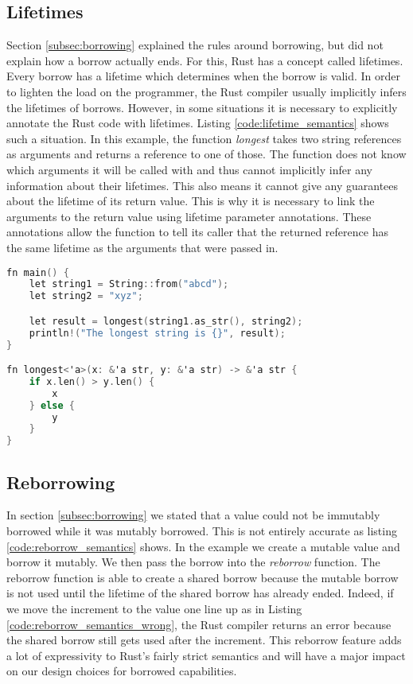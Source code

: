 \subsection{Lifetimes}
Section \ref{subsec:borrowing} explained the rules around borrowing, but did not explain how a borrow actually ends. For this, Rust has a concept called lifetimes. Every borrow has a lifetime which determines when the borrow is valid. In order to lighten the load on the programmer, the Rust compiler usually implicitly infers the lifetimes of borrows. However, in some situations it is necessary to explicitly annotate the Rust code with lifetimes. Listing \ref{code:lifetime_semantics} shows such a situation. In this example, the function \textit{longest} takes two string references as arguments and returns a reference to one of those. The function does not know which arguments it will be called with and thus cannot implicitly infer any information about their lifetimes. This also means it cannot give any guarantees about the lifetime of its return value. This is why it is necessary to link the arguments to the return value using lifetime parameter annotations. These annotations allow the function to tell its caller that the returned reference has the same lifetime as the arguments that were passed in.
\begin{lstlisting}[language=C,frame=single,caption=Lifetime Example,label=code:lifetime_semantics]
fn main() {
    let string1 = String::from("abcd");
    let string2 = "xyz";

    let result = longest(string1.as_str(), string2);
    println!("The longest string is {}", result);
}

fn longest<'a>(x: &'a str, y: &'a str) -> &'a str {
    if x.len() > y.len() {
        x
    } else {
        y
    }
}
\end{lstlisting} %

\label{fig:lifetime_semantics}

\subsection{Reborrowing}
In section \ref{subsec:borrowing} we stated that a value could not be immutably borrowed while it was mutably borrowed. This is not entirely accurate as listing \ref{code:reborrow_semantics} shows. In the example we create a mutable value and borrow it mutably. We then pass the borrow into the \textit{reborrow} function. The reborrow function is able to create a shared borrow because the mutable borrow is not used until the lifetime of the shared borrow has already ended. Indeed, if we move the increment to the value one line up as in Listing \ref{code:reborrow_semantics_wrong}, the Rust compiler returns an error because the shared borrow still gets used after the increment. This reborrow feature adds a lot of expressivity to Rust's fairly strict semantics and will have a major impact on our design choices for borrowed capabilities.


